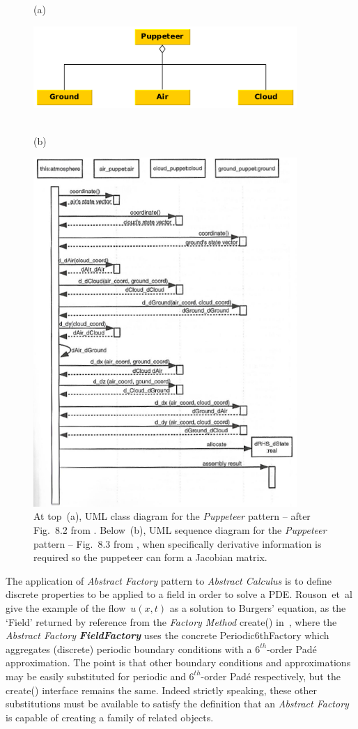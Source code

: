 \begin{figure}
(a)\centerline{\includegraphics[width=10cm]{../png/puppeteer_wa}}
\\(b)\centerline{\includegraphics[width=10cm]{../png/puppetseq}}
\caption{At top~(a), UML class diagram for the {\it Puppeteer} pattern -- after Fig.~8.2 from .
Below~(b), UML sequence diagram for the {\it Puppeteer} pattern -- Fig.~8.3 from ,
when specifically derivative information is required so the puppeteer can form a Jacobian matrix.\label{fig:puppet}}
\end{figure}


The application of {\it Abstract Factory} pattern to {\it Abstract Calculus} is to define
discrete properties to be applied to a field in order to solve a PDE. Rouson~et~al give the example of
the flow~$u(x,t)$ as a solution to Burgers' equation, as the `Field' returned by reference from
the {\it Factory Method} create() in~,
where the {\it Abstract Factory} {\it \bf FieldFactory} uses the concrete Periodic6thFactory which
aggregates (discrete) periodic boundary conditions with a $6^{th}$-order Pad\'{e} approximation.
The point is that other boundary conditions and approximations may be easily substituted for
periodic and $6^{th}$-order Pad\'{e} respectively, but the
create() interface remains the same. Indeed strictly speaking, these other substitutions  must be available
to satisfy the definition that an {\it Abstract Factory} is capable of creating a family of related objects.

